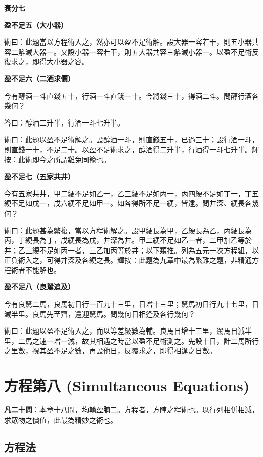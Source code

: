 \documentclass[11pt,a4paper]{article}
\newenvironment{problemenv}[1]{%
  \medskip\noindent\textbf{#1}\par\nopagebreak\smallskip
}{\medskip}
\begin{document}
\begin{problemenv}{衰分七}
\begin{problemenv}{盈不足五（大小器）}
\textsf{術曰：}此題當以方程術入之，然亦可以盈不足術解。設大器一容若干，則五小器共容二斛減大器一。又設小器一容若干，則五大器共容三斛減小器一。以盈不足術反復求之，即得大小器之容。
\end{problemenv}

\begin{problemenv}{盈不足六（二酒求價）}
今有醇酒一斗直錢五十，行酒一斗直錢一十。今將錢三十，得酒二斗。問醇行酒各幾何？

\textsf{答曰：}醇酒二升半，行酒一斗七升半。

\textsf{術曰：}此題以盈不足術解之。設醇酒一斗，則直錢五十，已過三十；設行酒一斗，則直錢一十，不足二十。以盈不足術求之，醇酒得二升半，行酒得一斗七升半。輝按：此術即今之所謂雞兔同籠也。
\end{problemenv}

\begin{problemenv}{盈不足七（五家共井）}
今有五家共井，甲二綆不足如乙一，乙三綆不足如丙一，丙四綆不足如丁一，丁五綆不足如戊一，戊六綆不足如甲一。如各得所不足一綆，皆逮。問井深、綆長各幾何？

\textsf{術曰：}此題甚為繁複，當以方程術解之。設甲綆長為甲，乙綆長為乙，丙綆長為丙，丁綆長為丁，戊綆長為戊，井深為井。甲二綆不足如乙一者，二甲加乙等於井；乙三綆不足如丙一者，三乙加丙等於井；以下類推。列為五元一次方程組，以正負術入之，可得井深及各綆之長。輝按：此題為九章中最為繁難之題，非精通方程術者不能解也。
\end{problemenv}

\begin{problemenv}{盈不足八（良駑追及）}
今有良駑二馬，良馬初日行一百九十三里，日增十三里；駑馬初日行九十七里，日減半里。良馬先至齊，還迎駑馬。問幾何日相逢及各行幾何？

\textsf{術曰：}此題以盈不足術入之，而以等差級數為輔。良馬日增十三里，駑馬日減半里，二馬之速一增一減，故其相遇之時當以盈不足術測之。先設十日，計二馬所行之里數，視其盈不足之數，再設他日，反覆求之，即得相逢之日數。
\end{problemenv}

\newpage
\section{方程第八 (Simultaneous Equations)}

\textbf{凡二十問}：本章十八問，均輸盈朒二。方程者，方陣之程術也。以行列相併相減，求眾物之價值，此最為精妙之術也。

\subsection{方程法}


\end{problemenv}
\end{document}
